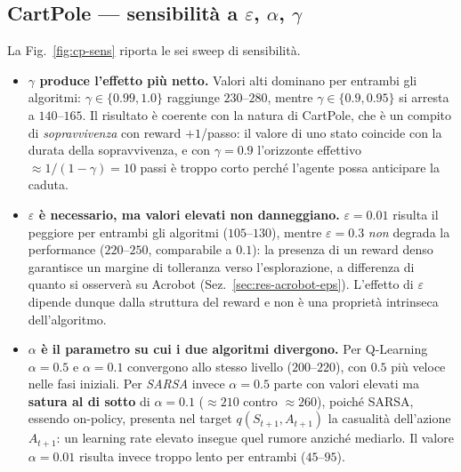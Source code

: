 

\subsection{CartPole --- sensibilit\`a a $\varepsilon$, $\alpha$, $\gamma$}
\label{sec:res-cartpole-sens}

La Fig.~\ref{fig:cp-sens} riporta le sei sweep di sensibilit\`a.

\begin{itemize}
  \item \textbf{$\gamma$ produce l'effetto pi\`u netto.} Valori alti dominano per entrambi
        gli algoritmi: $\gamma \in \{0.99, 1.0\}$ raggiunge $230$--$280$, mentre
        $\gamma \in \{0.9, 0.95\}$ si arresta a $140$--$165$. Il risultato \`e coerente
        con la natura di CartPole, che \`e un compito di \emph{sopravvivenza} con reward
        $+1$/passo: il valore di uno stato coincide con la durata della sopravvivenza, e
        con $\gamma=0.9$ l'orizzonte effettivo $\approx 1/(1-\gamma) = 10$ passi \`e troppo
        corto perch\'e l'agente possa anticipare la caduta.
  \item \textbf{$\varepsilon$ \`e necessario, ma valori elevati non danneggiano.}
        $\varepsilon=0.01$ risulta il peggiore per entrambi gli algoritmi ($105$--$130$),
        mentre $\varepsilon=0.3$ \emph{non} degrada la performance ($220$--$250$, comparabile
        a $0.1$): la presenza di un reward denso garantisce un margine di tolleranza verso
        l'esplorazione, a differenza di quanto si osserver\`a su Acrobot
        (Sez.~\ref{sec:res-acrobot-eps}). L'effetto di $\varepsilon$ dipende dunque dalla
        struttura del reward e non \`e una propriet\`a intrinseca dell'algoritmo.
  \item \textbf{$\alpha$ \`e il parametro su cui i due algoritmi divergono.} Per
        Q\hbox{-}Learning $\alpha=0.5$ e $\alpha=0.1$ convergono allo stesso livello
        ($200$--$220$), con $0.5$ pi\`u veloce nelle fasi iniziali. Per \emph{SARSA} invece
        $\alpha=0.5$ parte con valori elevati ma \textbf{satura al di sotto} di
        $\alpha=0.1$ ($\approx 210$ contro $\approx 260$), poich\'e SARSA, essendo
        on-policy, presenta nel target $q(S_{t+1},A_{t+1})$ la casualit\`a dell'azione
        $A_{t+1}$: un learning rate elevato insegue quel rumore anzich\'e mediarlo.
        Il valore $\alpha=0.01$ risulta invece troppo lento per entrambi ($45$--$95$).
\end{itemize}

